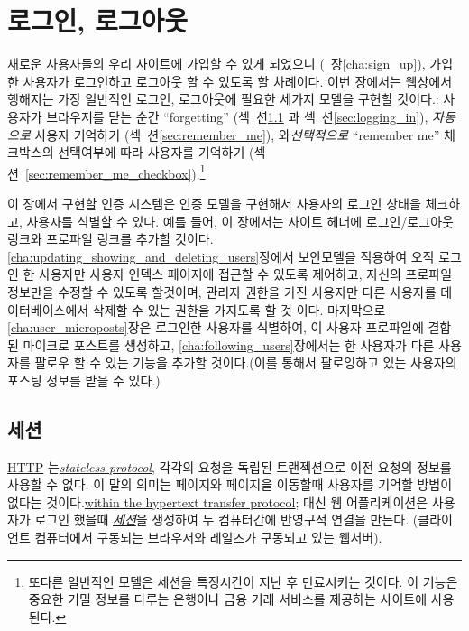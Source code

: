 \chapter{로그인, 로그아웃} %
\label{cha:log_in_log_out}



새로운 사용자들의 우리 사이트에 가입할 수 있게 되었으니 (~장\ref{cha:sign_up}), 가입한 사용자가 로그인하고 로그아웃 할 수 있도록 할 차례이다. 이번 장에서는 웹상에서 행해지는 가장 일반적인 로그인, 로그아웃에 필요한 세가지 모델을 구현할 것이다.:  사용자가 브라우저를 닫는 순간 ``forgetting'' (섹~션\ref{sec:sessions_and_failed_login}  과 섹~션\ref{sec:logging_in}), \emph{자동으로} 사용자 기억하기 (섹~션\ref{sec:remember_me}),  와\emph{선택적으로} ``remember me'' 체크박스의 선택여부에 따라 사용자를 기억하기 (섹션~\ref{sec:remember_me_checkbox}).\footnote{또다른 일반적인 모델은 세션을 특정시간이 지난 후 만료시키는 것이다. 이 기능은 중요한 기밀 정보를 다루는 은행이나 금융 거래 서비스를 제공하는 사이트에 사용된다.} 

이 장에서 구현할 인증 시스템은 인증 모델을 구현해서 사용자의 로그인 상태을 체크하고, 사용자를 식별할 수 있다. 예를 들어, 이 장에서는 사이트 헤더에 로그인/로그아웃 링크와 프로파일 링크를 추가할 것이다. \ref{cha:updating_showing_and_deleting_users}장에서 보안모델을 적용하여 오직 로그인 한 사용자만 사용자 인덱스 페이지에 접근할 수 있도록 제어하고, 자신의 프로파일 정보만을 수정할 수 있도록 할것이며, 관리자 권한을 가진 사용자만 다른 사용자를 데이터베이스에서 삭제할 수 있는 권한을 가지도록 할 것 이다. 마지막으로 \ref{cha:user_microposts}장은 로그인한 사용자를 식별하여, 이 사용자 프로파일에 결합된 마이크로 포스트를 생성하고, \ref{cha:following_users}장에서는 한 사용자가 다른 사용자를 팔로우 할 수 있는 기능을 추가할 것이다.(이를 통해서 팔로잉하고 있는 사용자의 포스팅 정보를 받을 수 있다.) 


  \section{세션}
  \label{sec:sessions_and_failed_login}

\href{http://en.wikipedia.org/wiki/Hypertext_Transfer_Protocol}{HTTP} 는\href{https://en.wikipedia.org/wiki/Stateless_protocol}{\emph{stateless protocol}}, 각각의 요청을 독립된 트랜젝션으로 이전 요청의 정보를 사용할 수 없다. 이 말의 의미는 페이지와 페이지을 이동할때 사용자를 기억할 방법이 없다는 것이다.\href{http://en.wikipedia.org/wiki/Hypertext_Transfer_Protocol#HTTP_session_state}{within the hypertext transfer protocol}; 대신 웹 어플리케이션은 사용자가 로그인 했을때 \href{http://en.wikipedia.org/wiki/Session_(computer_science)}{\emph{세션}}을 생성하여 두 컴퓨터간에 반영구적 연결을 만든다. (클라이언트 컴퓨터에서 구동되는 브라우저와 레일즈가 구동되고 있는 웹서버). 

